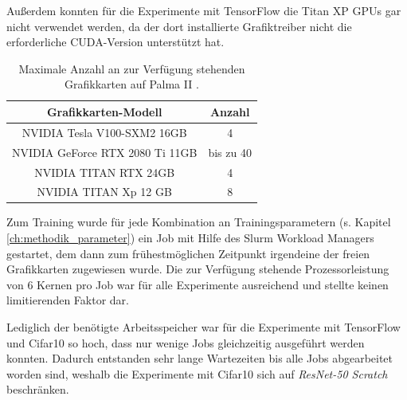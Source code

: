 Außerdem konnten für die Experimente mit TensorFlow \cite{tensorflow} die Titan XP GPUs gar nicht verwendet werden, da der dort installierte Grafiktreiber nicht die erforderliche CUDA-Version unterstützt hat.

\begin{table}[H]
\centering
\begin{adjustbox}{scale=.9, center}
\begin{tabular}{|c|c|}
\hline 
Grafikkarten-Modell & Anzahl \\ 
\hline 
NVIDIA Tesla V100-SXM2 16GB & 4 \\ 
\hline 
NVIDIA GeForce RTX 2080 Ti 11GB & bis zu 40\\
\hline
NVIDIA TITAN RTX 24GB & 4\\
\hline
NVIDIA TITAN Xp 12 GB & 8\\
\hline
\end{tabular} 
\end{adjustbox}
\caption{Maximale Anzahl an zur Verfügung stehenden Grafikkarten auf Palma II \cite{palma2}.}
\label{tab:palmaGPUs}
\end{table}


Zum Training wurde für jede Kombination an Trainingsparametern (s. Kapitel \ref{ch:methodik_parameter}) ein Job mit Hilfe des Slurm Workload Managers \cite{slurm} gestartet, dem dann zum frühestmöglichen Zeitpunkt irgendeine der freien Grafikkarten zugewiesen wurde. Die zur Verfügung stehende Prozessorleistung von 6 Kernen pro Job war für alle Experimente ausreichend und stellte keinen limitierenden Faktor dar.

Lediglich der benötigte Arbeitsspeicher war für die Experimente mit TensorFlow \cite{tensorflow} und Cifar10 \cite{cifar10} so hoch, dass nur wenige Jobs gleichzeitig ausgeführt werden konnten. Dadurch entstanden sehr lange Wartezeiten bis alle Jobs abgearbeitet worden sind, weshalb die Experimente mit Cifar10 \cite{cifar10} sich auf \textit{ResNet-50 Scratch} beschränken.

